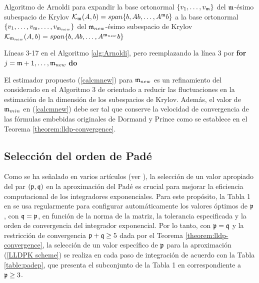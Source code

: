 \begin{algorithm}[!htb]
	\caption{Algoritmo de Arnoldi para expandir la base ortonormal $\{v_1,\ldots,v_{\mathfrak{m}} \}$ del $\mathfrak{m}$-ésimo subespacio de Krylov $\mathcal{K}_{\mathfrak{m}}(A,b)=span\{b,Ab,\ldots,A^{\mathfrak{m}}b\}$ a la base ortonormal $\{v_1,\ldots,v_{\mathfrak{m}},\ldots,v_{\mathfrak{m}_{new}} \}$ del $\mathfrak{m}_{new}$-ésimo subespacio de Krylov ${\mathcal{K}_{\mathfrak{m}_{new}}(A,b)=span\{b,Ab,\ldots,A^{\mathfrak{m}_{new}}b\}}$}
    \label{alg:Arnoldiexpand}
	Líneas 3-17 en el Algoritmo \ref{alg:Arnoldi}, pero reemplazando la línea 3 por \textbf{for} $j=\mathfrak{m}+1,\ldots,\mathfrak{m}_{new}$ \textbf{do}
\end{algorithm}
El estimador propuesto (\ref{calcmnew}) para $\mathfrak{m}_{new}$ es un refinamiento del considerado en el Algoritmo 3 de \cite{niesen2012algorithm} orientado a reducir las fluctuaciones en la estimación de la dimensión de los subespacios de Krylov. Además, el valor de $\mathfrak{m}_{min}$ en (\ref{calcmnew}) debe ser tal que conserve la velocidad de convergencia de las fórmulas embebidas originales de Dormand y Prince como se establece en el Teorema \ref{theorem:lldp-convergence}.

\subsection{Selección del orden de Padé}\label{sec:pade-order}
Como se ha señalado en varios artículos (ver \cite{jimenez2009rate,jimenez2012convergence, Jimenez14AMC, jimenez2015convergence}), la selección de un valor apropiado del par $(\mathfrak{p},\mathfrak{q})$ en la aproximación del Padé es crucial para mejorar la eficiencia computacional de los integradores exponenciales. Para este propósito, la Tabla 1 en \cite{moler2003nineteen} se usa regularmente para configurar automáticamente los valores óptimos de $\mathfrak{p}$, con $\mathfrak{q}=\mathfrak{p}$, en función de la norma de la matriz, la tolerancia especificada y la orden de convergencia del integrador exponencial. Por lo tanto, con $\mathfrak{p}=\mathfrak{q}$ y la restricción de convergencia $\mathfrak{p}+\mathfrak{q}\geq5$ dada por el Teorema \ref{theorem:lldp-convergence}, la selección de un valor específico de $\mathfrak{p}$ para la aproximación (\ref{LLDPK scheme}) se realiza en cada paso de integración de acuerdo con la Tabla \ref{table:padep}, que presenta el subconjunto de la Tabla 1 en \cite{moler2003nineteen} correspondiente a $\mathfrak{p} \ge 3$.

